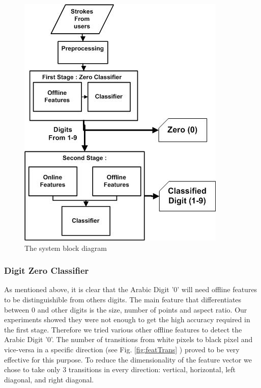 \documentclass[times, 10pt,twocolumn]{article}
\begin{document}
 \begin{figure}
	\centering
		\includegraphics[scale=0.5]{Block}
	\caption[System Block Diagram] {The system block diagram}
	\label{fig:flowChart}
\end{figure}


\subsubsection{Digit Zero Classifier }
\label{sec:DigitZeroClassifier}


As mentioned above, it is clear that the Arabic Digit '0' will need offline features to be distinguishible from others digits. The main feature that differentiates between 0 and other digits is the size, number of points and aspect ratio. Our experiments showed they were not enough to get the high accuracy required in the first stage. Therefore we tried various other offline features to detect the Arabic Digit '0'. The number of transitions from white pixels to black pixel and vice-versa in a specific direction (see Fig. \ref{fig:featTrans} ) proved to be very effective for this purpose. To reduce the dimensionality of the feature vector we chose to take only 3 transitions in every direction: vertical, horizontal, left diagonal, and right diagonal.
\end{document}
